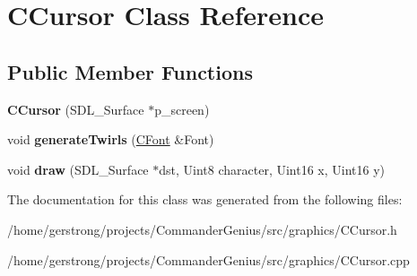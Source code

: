 \hypertarget{class_c_cursor}{
\section{CCursor Class Reference}
\label{class_c_cursor}
}
\subsection*{Public Member Functions}
\begin{DoxyCompactItemize}
\item 
\hypertarget{class_c_cursor_a5f7ad6764ffd9c33812d6df3b1ab0d75}{
{\bfseries CCursor} (SDL\_\-Surface $\ast$p\_\-screen)}
\label{class_c_cursor_a5f7ad6764ffd9c33812d6df3b1ab0d75}

\item 
\hypertarget{class_c_cursor_ab378364a2ff23c889ec446c218f65edb}{
void {\bfseries generateTwirls} (\hyperlink{class_c_font}{CFont} \&Font)}
\label{class_c_cursor_ab378364a2ff23c889ec446c218f65edb}

\item 
\hypertarget{class_c_cursor_a3875bbea2096d3158c91d5fd1dd8a214}{
void {\bfseries draw} (SDL\_\-Surface $\ast$dst, Uint8 character, Uint16 x, Uint16 y)}
\label{class_c_cursor_a3875bbea2096d3158c91d5fd1dd8a214}

\end{DoxyCompactItemize}


The documentation for this class was generated from the following files:\begin{DoxyCompactItemize}
\item 
/home/gerstrong/projects/CommanderGenius/src/graphics/CCursor.h\item 
/home/gerstrong/projects/CommanderGenius/src/graphics/CCursor.cpp\end{DoxyCompactItemize}
